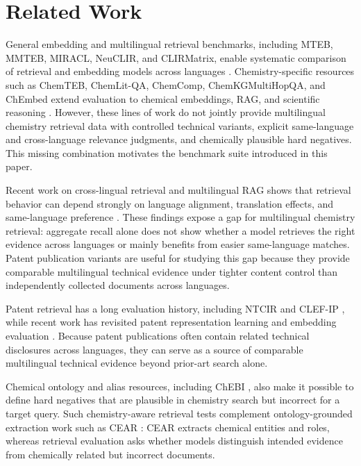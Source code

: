 \section{Related Work}

General embedding and multilingual retrieval benchmarks, including MTEB, MMTEB,
MIRACL, NeuCLIR, and CLIRMatrix, enable systematic comparison of retrieval and
embedding models across languages
\citep{miracl2023,neuclir2023,muennighoff2023mteb,mmteb2025,clirmatrix2020}.
Chemistry-specific resources such as ChemTEB, ChemLit-QA, ChemComp,
ChemKGMultiHopQA, and ChEmbed extend evaluation to chemical embeddings, RAG, and
scientific reasoning
\citep{chemteb2024,chemlitqa2024,khodadad2026chemcomp,astaraki2026iterativerag,chembed2025}.
However, these lines of work do not jointly provide multilingual chemistry
retrieval data with controlled technical variants, explicit same-language and
cross-language relevance judgments, and chemically plausible hard negatives. This
missing combination motivates the benchmark suite introduced in this paper.

Recent work on cross-lingual retrieval and multilingual RAG shows that retrieval
behavior can depend strongly on language alignment, translation effects, and
same-language preference
\citep{whatdrivesclir2025,crosslingualcost2025,bordirlines2024,xrag2025,nepotism2025}.
These findings expose a gap for multilingual chemistry retrieval: aggregate
recall alone does not show whether a model retrieves the right evidence across
languages or mainly benefits from easier same-language matches. Patent
publication variants are useful for studying this gap because they provide
comparable multilingual technical evidence under tighter content control than
independently collected documents across languages.

Patent retrieval has a long evaluation history, including NTCIR and CLEF-IP
\citep{prime2002,clefip2013}, while recent work has revisited patent
representation learning and embedding evaluation
\citep{paecter2024,patentembeddings2026}. Because patent publications often
contain related technical disclosures across languages, they can serve as a
source of comparable multilingual technical evidence beyond prior-art search
alone.

Chemical ontology and alias resources, including ChEBI \citep{chebi2016}, also
make it possible to define hard negatives that are plausible in chemistry search
but incorrect for a target query. Such chemistry-aware retrieval tests complement
ontology-grounded extraction work such as CEAR \citep{cear2024}: CEAR extracts
chemical entities and roles, whereas retrieval evaluation asks whether models
distinguish intended evidence from chemically related but incorrect documents.
